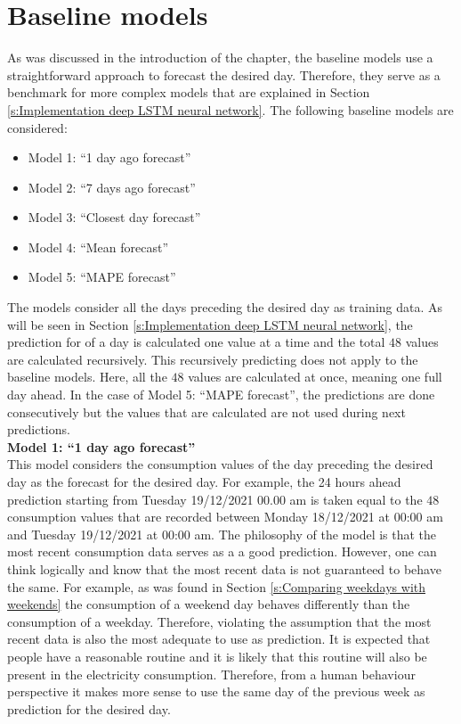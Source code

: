 \section{Baseline models}\label{s:Baseline models}
As was discussed in the introduction of the chapter, the baseline models use a straightforward approach to forecast the desired day. Therefore, they serve as a benchmark for more complex models that are explained in Section \ref{s:Implementation deep LSTM neural network}. The following baseline models are considered:

\begin{itemize}
	\item Model 1: ``1 day ago forecast''
	\item Model 2: ``7 days ago forecast''
	\item Model 3: ``Closest day forecast''
	\item Model 4: ``Mean forecast''
	\item Model 5: ``MAPE forecast''
\end{itemize} 

The models consider all the days preceding the desired day as training data. As will be seen in Section \ref{s:Implementation deep LSTM neural network}, the prediction for of a day is calculated one value at a time and the total $ 48 $ values are calculated recursively. This recursively predicting does not apply to the baseline models. Here, all the $ 48 $ values are calculated at once, meaning one full day ahead. In the case of Model 5: ``MAPE forecast'', the predictions are done consecutively but the values that are calculated are not used during next predictions.\\


\textbf{Model 1: ``1 day ago forecast''}\\
This model considers the consumption values of the day preceding the desired day as the forecast for the desired day. For example, the 24 hours ahead prediction starting from Tuesday 19/12/2021 00.00 am is taken equal to the $ 48 $ consumption values that are recorded between Monday 18/12/2021 at 00:00 am and Tuesday 19/12/2021 at 00:00 am. The philosophy of the model is that the most recent consumption data serves as a a good prediction. However, one can think logically and know that the most recent data is not guaranteed to behave the same. For example, as was found in Section \ref{s:Comparing weekdays with weekends} the consumption of a weekend day behaves differently than the consumption of a weekday. Therefore, violating the assumption that the most recent data is also the most adequate to use as prediction. It is expected that people have a reasonable routine and it is likely that this routine will also be present in the electricity consumption. Therefore, from a human behaviour perspective it makes more sense to use the same day of the previous week as prediction for the desired day.\\

